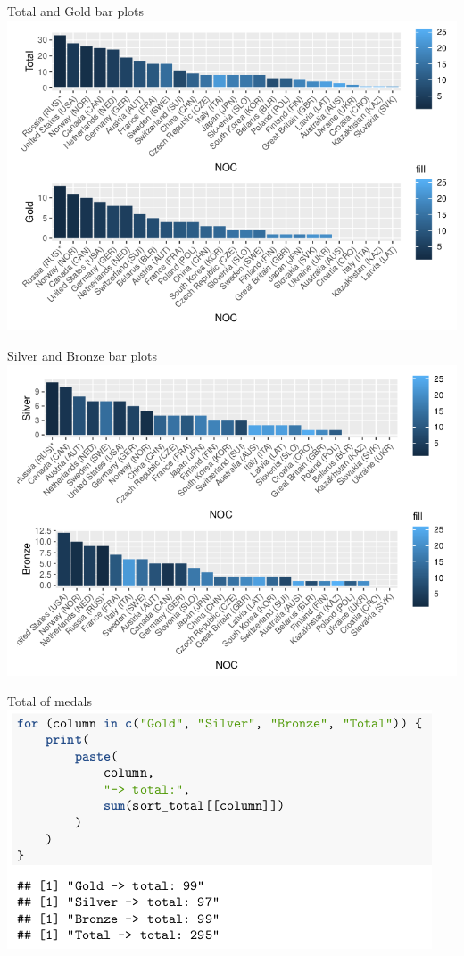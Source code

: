 \documentclass{beamer}
\begin{document}
\begin{frame}{Total and Gold bar plots}
    \includegraphics[width=.95\textwidth]{img/ex2_part3_screenshot04.png}
\end{frame}

\begin{frame}{Silver and Bronze bar plots}
    \includegraphics[width=.9\textwidth]{img/ex2_part3_screenshot06.png}
\end{frame}

\begin{frame}{Total of medals}
    \includegraphics[width=.8\textwidth]{img/ex2_part3_screenshot10.png}
\end{frame}
\end{document}
